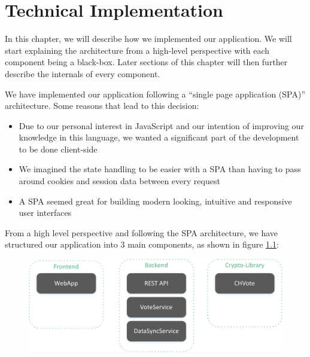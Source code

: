 \chapter{Technical Implementation}
In this chapter, we will describe how we implemented our application. We will start explaining the architecture from a high-level perspective with each component being a black-box. Later sections of this chapter will then further describe the internals of every component.

We have implemented our application following a "`single page application (SPA)"' architecture. Some reasons that lead to this decision:
\begin{itemize}	
	\item Due to our personal interest in JavaScript and our intention of improving our knowledge in this language, we wanted a significant part of the development to be done client-side
	\item We imagined the state handling to be easier with a SPA than having to pass around cookies and session data between every request
	\item A SPA seemed great for building modern looking, intuitive and responsive user interfaces
\end{itemize}

From a high level perspective and following the SPA architecture, we have structured our application into 3 main components, as shown in figure \ref{System components}:

\begin{figure}[h!]
\begin{center}
\includegraphics[scale=0.95]{assets/componentdiagram.pdf}
\label{System components}
\end{center}
\end{figure}

